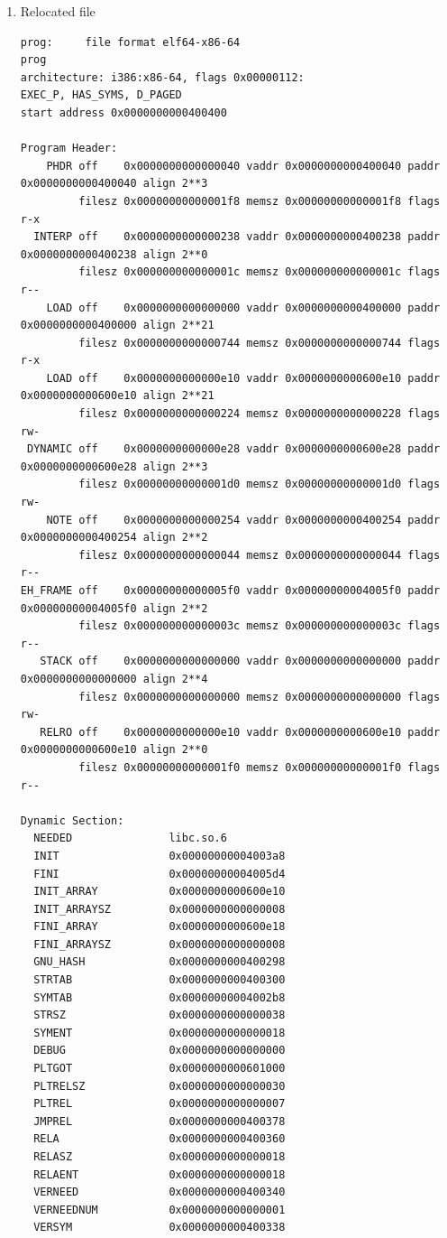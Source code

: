 \documentclass[11pt]{article}
\begin{document}
\begin{enumerate}
\item Relocated file
\label{sec:org7660ff5}
\begin{verbatim}
prog:     file format elf64-x86-64
prog
architecture: i386:x86-64, flags 0x00000112:
EXEC_P, HAS_SYMS, D_PAGED
start address 0x0000000000400400

Program Header:
    PHDR off    0x0000000000000040 vaddr 0x0000000000400040 paddr 0x0000000000400040 align 2**3
         filesz 0x00000000000001f8 memsz 0x00000000000001f8 flags r-x
  INTERP off    0x0000000000000238 vaddr 0x0000000000400238 paddr 0x0000000000400238 align 2**0
         filesz 0x000000000000001c memsz 0x000000000000001c flags r--
    LOAD off    0x0000000000000000 vaddr 0x0000000000400000 paddr 0x0000000000400000 align 2**21
         filesz 0x0000000000000744 memsz 0x0000000000000744 flags r-x
    LOAD off    0x0000000000000e10 vaddr 0x0000000000600e10 paddr 0x0000000000600e10 align 2**21
         filesz 0x0000000000000224 memsz 0x0000000000000228 flags rw-
 DYNAMIC off    0x0000000000000e28 vaddr 0x0000000000600e28 paddr 0x0000000000600e28 align 2**3
         filesz 0x00000000000001d0 memsz 0x00000000000001d0 flags rw-
    NOTE off    0x0000000000000254 vaddr 0x0000000000400254 paddr 0x0000000000400254 align 2**2
         filesz 0x0000000000000044 memsz 0x0000000000000044 flags r--
EH_FRAME off    0x00000000000005f0 vaddr 0x00000000004005f0 paddr 0x00000000004005f0 align 2**2
         filesz 0x000000000000003c memsz 0x000000000000003c flags r--
   STACK off    0x0000000000000000 vaddr 0x0000000000000000 paddr 0x0000000000000000 align 2**4
         filesz 0x0000000000000000 memsz 0x0000000000000000 flags rw-
   RELRO off    0x0000000000000e10 vaddr 0x0000000000600e10 paddr 0x0000000000600e10 align 2**0
         filesz 0x00000000000001f0 memsz 0x00000000000001f0 flags r--

Dynamic Section:
  NEEDED               libc.so.6
  INIT                 0x00000000004003a8
  FINI                 0x00000000004005d4
  INIT_ARRAY           0x0000000000600e10
  INIT_ARRAYSZ         0x0000000000000008
  FINI_ARRAY           0x0000000000600e18
  FINI_ARRAYSZ         0x0000000000000008
  GNU_HASH             0x0000000000400298
  STRTAB               0x0000000000400300
  SYMTAB               0x00000000004002b8
  STRSZ                0x0000000000000038
  SYMENT               0x0000000000000018
  DEBUG                0x0000000000000000
  PLTGOT               0x0000000000601000
  PLTRELSZ             0x0000000000000030
  PLTREL               0x0000000000000007
  JMPREL               0x0000000000400378
  RELA                 0x0000000000400360
  RELASZ               0x0000000000000018
  RELAENT              0x0000000000000018
  VERNEED              0x0000000000400340
  VERNEEDNUM           0x0000000000000001
  VERSYM               0x0000000000400338


\end{verbatim}
\end{enumerate}
\end{document}
